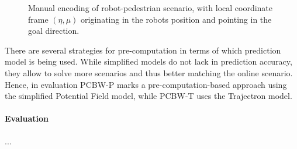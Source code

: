 \begin{figure}[!ht]
\begin{center}
\end{center}
\caption{Manual encoding of robot-pedestrian scenario, with local coordinate frame $(\eta, \mu)$ originating in the robots position and pointing in the goal direction.}
\label{img:pcbw_encoding_manual}
\end{figure}

There are several strategies for pre-computation in terms of which prediction model is being used. While simplified models do not lack in prediction accuracy, they allow to solve more scenarios and thus better matching the online scenario. Hence, in evaluation \ac{PCBW}-P marks a pre-computation-based approach using the simplified Potential Field model, while \ac{PCBW}-T uses the Trajectron model. 

\paragraph{Evaluation} ...
